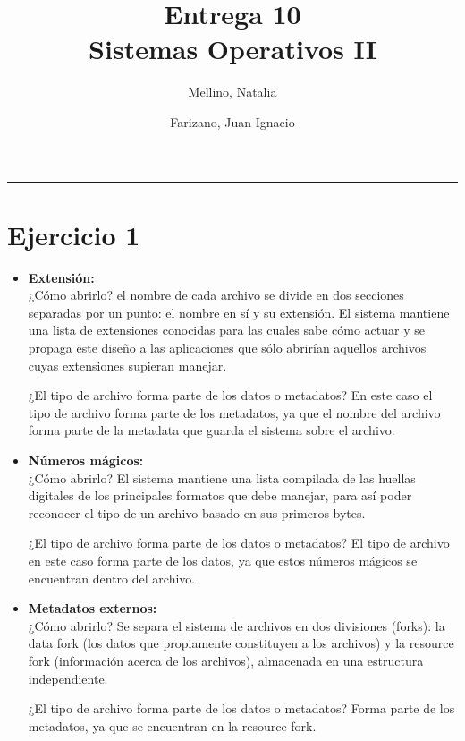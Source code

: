 \documentclass[11pt]{article}
\title{
    Entrega 10 \\
    \large Sistemas Operativos II}
\author{Mellino, Natalia \and Farizano, Juan Ignacio}
\date{}
\begin{document}
\maketitle

\noindent\rule{\textwidth}{1pt}

\section*{Ejercicio 1}

\begin{itemize}

\item \textbf{Extensión:} \\
  ¿Cómo abrirlo? el nombre de cada archivo se divide en dos secciones separadas
  por un punto: el nombre en sí y su extensión. El sistema mantiene una lista de
  extensiones conocidas para las cuales sabe cómo actuar y se propaga este diseño
  a las aplicaciones que sólo abrirían aquellos archivos cuyas extensiones
  supieran manejar.
  
  ¿El tipo de archivo forma parte de los datos o metadatos? En este caso el tipo
  de archivo forma parte de los metadatos, ya que el nombre del archivo forma
  parte de la metadata que guarda el sistema sobre el archivo.
  
\item \textbf{Números mágicos:} \\
  ¿Cómo abrirlo? El sistema mantiene una lista compilada de las huellas digitales
  de los principales formatos que debe manejar, para así poder reconocer el tipo
  de un archivo basado en sus primeros bytes.
  
  ¿El tipo de archivo forma parte de los datos o metadatos? El tipo de archivo en 
  este caso forma parte de los datos, ya que estos números mágicos se encuentran
  dentro del archivo.
  
\item \textbf{Metadatos externos:} \\
  ¿Cómo abrirlo? Se separa el sistema de archivos en dos divisiones (forks):
  la data fork (los datos que propiamente constituyen a los archivos) y la resource fork
  (información acerca de los archivos), almacenada en una estructura independiente.
  
  ¿El tipo de archivo forma parte de los datos o metadatos? Forma parte de los
  metadatos, ya que se encuentran en la resource fork.

\end{itemize}
\end{document}
